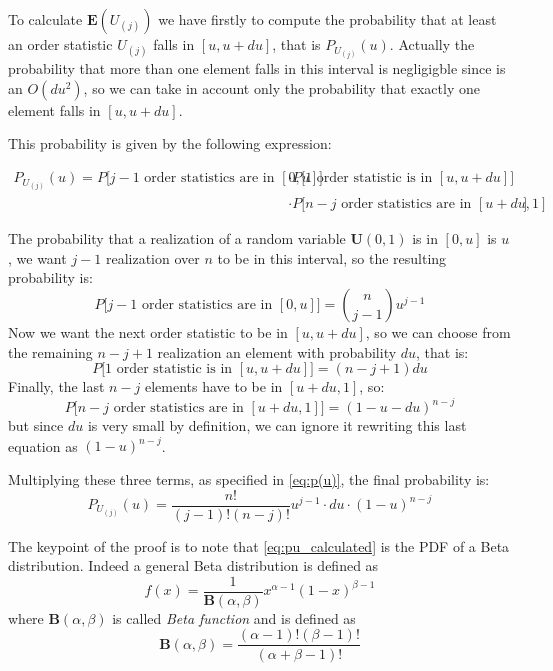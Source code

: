 \documentclass[11pt,a4paper]{article}
\begin{document}
\section{}

To calculate $\mathbf{E}(U_{(j)})$ we have firstly to compute the probability that at least an order statistic $U_{(j)}$ falls in $[u, u+du]$, that is $P_{U_{(j)}}(u)$. Actually the probability that more than one element falls in this interval is negligigble since is an $O(du^2)$, so we can take in account only the probability that exactly one element falls in $[u, u+du]$.

This probability is given by the following expression:

\begin{equation}\label{eq:p(u)}
  \begin{split}
    P_{U_{(j)}}(u) = P\bigg[\text{$j-1$ order statistics are in $[0, u]$}\bigg] &\cdot P\bigg[\text{1 order statistic is in $[u, u+du]$}\bigg] \\&\cdot P\bigg[\text{$n-j$ order statistics are in $[u+du, 1]$}\bigg]
  \end{split}
\end{equation}

The probability that a realization of a random variable $\mathbf{U}(0,1)$ is in $[0, u]$ is $u$, we want $j-1$ realization over $n$ to be in this interval, so the resulting probability is:
$$
P\bigg[\text{$j-1$ order statistics are in $[0, u]$}\bigg] = \binom{n}{j-1}u^{j-1}
$$
Now we want the next order statistic to be in $[u, u+du]$, so we can choose from the remaining $n-j+1$ realization an element with probability $du$, that is:
$$ P\bigg[\text{1 order statistic is in $[u, u+du]$}\bigg] = (n-j+1)du$$
Finally, the last $n-j$ elements have to be in $[u+du,1]$, so:
$$ P\bigg[\text{$n-j$ order statistics are in $[u+du, 1]$}\bigg] = (1-u-du)^{n-j} $$
but since $du$ is very small by definition, we can ignore it rewriting this last equation as $(1-u)^{n-j}$.

Multiplying these three terms, as specified in \autoref{eq:p(u)}, the final probability is:
\begin{equation}
  \label{eq:pu_calculated}
  P_{U_{(j)}}(u) = \frac{n!}{(j-1)!(n-j)!}u^{j-1}\cdot du \cdot (1-u)^{n-j}
\end{equation}

The keypoint of the proof is to note that \autoref{eq:pu_calculated} is the PDF of a Beta distribution.
Indeed a general Beta distribution is defined as
\begin{equation}
  \label{eq:beta}
  f(x) = \frac{1}{\mathbf{B}(\alpha,\beta)}x^{\alpha-1}(1-x)^{\beta-1}
\end{equation}
where $\mathbf{B}(\alpha,\beta)$ is called \textit{Beta function} and is defined as
\begin{equation}
  \label{eq:beta_func}
  \mathbf{B}(\alpha,\beta) = \frac{(\alpha-1)!(\beta-1)!}{(\alpha+\beta-1)!}
\end{equation}
\end{document}
